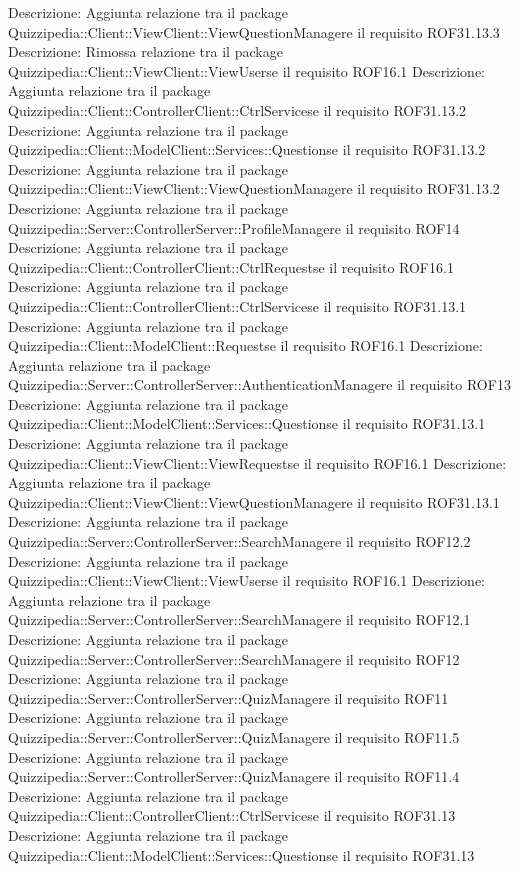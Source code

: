 Descrizione: Aggiunta relazione tra il package Quizzipedia::Client::ViewClient::ViewQuestionManagere il requisito ROF31.13.3 
Descrizione: Rimossa relazione tra il package Quizzipedia::Client::ViewClient::ViewUserse il requisito ROF16.1 
Descrizione: Aggiunta relazione tra il package Quizzipedia::Client::ControllerClient::CtrlServicese il requisito ROF31.13.2 
Descrizione: Aggiunta relazione tra il package Quizzipedia::Client::ModelClient::Services::Questionse il requisito ROF31.13.2 
Descrizione: Aggiunta relazione tra il package Quizzipedia::Client::ViewClient::ViewQuestionManagere il requisito ROF31.13.2 
Descrizione: Aggiunta relazione tra il package Quizzipedia::Server::ControllerServer::ProfileManagere il requisito ROF14 
Descrizione: Aggiunta relazione tra il package Quizzipedia::Client::ControllerClient::CtrlRequestse il requisito ROF16.1 
Descrizione: Aggiunta relazione tra il package Quizzipedia::Client::ControllerClient::CtrlServicese il requisito ROF31.13.1 
Descrizione: Aggiunta relazione tra il package Quizzipedia::Client::ModelClient::Requestse il requisito ROF16.1 
Descrizione: Aggiunta relazione tra il package Quizzipedia::Server::ControllerServer::AuthenticationManagere il requisito ROF13 
Descrizione: Aggiunta relazione tra il package Quizzipedia::Client::ModelClient::Services::Questionse il requisito ROF31.13.1 
Descrizione: Aggiunta relazione tra il package Quizzipedia::Client::ViewClient::ViewRequestse il requisito ROF16.1 
Descrizione: Aggiunta relazione tra il package Quizzipedia::Client::ViewClient::ViewQuestionManagere il requisito ROF31.13.1 
Descrizione: Aggiunta relazione tra il package Quizzipedia::Server::ControllerServer::SearchManagere il requisito ROF12.2 
Descrizione: Aggiunta relazione tra il package Quizzipedia::Client::ViewClient::ViewUserse il requisito ROF16.1 
Descrizione: Aggiunta relazione tra il package Quizzipedia::Server::ControllerServer::SearchManagere il requisito ROF12.1 
Descrizione: Aggiunta relazione tra il package Quizzipedia::Server::ControllerServer::SearchManagere il requisito ROF12 
Descrizione: Aggiunta relazione tra il package Quizzipedia::Server::ControllerServer::QuizManagere il requisito ROF11 
Descrizione: Aggiunta relazione tra il package Quizzipedia::Server::ControllerServer::QuizManagere il requisito ROF11.5 
Descrizione: Aggiunta relazione tra il package Quizzipedia::Server::ControllerServer::QuizManagere il requisito ROF11.4 
Descrizione: Aggiunta relazione tra il package Quizzipedia::Client::ControllerClient::CtrlServicese il requisito ROF31.13 
Descrizione: Aggiunta relazione tra il package Quizzipedia::Client::ModelClient::Services::Questionse il requisito ROF31.13 

